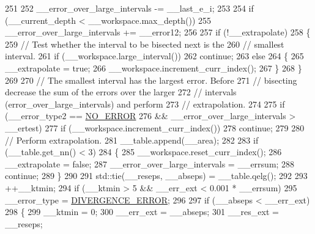 \begin{DoxyCode}
251 
252           \_\_error\_over\_large\_intervals -= \_\_last\_e\_i;
253 
254           \textcolor{keywordflow}{if} (\_\_current\_depth < \_\_workspace.max\_depth())
255             \_\_error\_over\_large\_intervals += \_\_error12;
256 
257           \textcolor{keywordflow}{if} (!\_\_extrapolate)
258             \{
259               \textcolor{comment}{// Test whether the interval to be bisected next is the}
260               \textcolor{comment}{// smallest interval.}
261               \textcolor{keywordflow}{if} (\_\_workspace.large\_interval())
262                 \textcolor{keywordflow}{continue};
263               \textcolor{keywordflow}{else}
264                 \{
265                   \_\_extrapolate = \textcolor{keyword}{true};
266                   \_\_workspace.increment\_curr\_index();
267                 \}
268             \}
269 
270           \textcolor{comment}{// The smallest interval has the largest error.  Before}
271           \textcolor{comment}{// bisecting decrease the sum of the errors over the larger}
272           \textcolor{comment}{// intervals (error\_over\_large\_intervals) and perform}
273           \textcolor{comment}{// extrapolation.}
274 
275           \textcolor{keywordflow}{if} (\_\_error\_type2 == \hyperlink{namespace____gnu__cxx_ad6c62dd86a596716cece6ac2d4cfd4b3ac31eecc280b10dec2efb4a2216ccc2e0}{NO\_ERROR}
276            && \_\_error\_over\_large\_intervals > \_\_ertest)
277             \textcolor{keywordflow}{if} (\_\_workspace.increment\_curr\_index())
278               \textcolor{keywordflow}{continue};
279 
280           \textcolor{comment}{// Perform extrapolation.}
281           \_\_table.append(\_\_area);
282 
283           \textcolor{keywordflow}{if} (\_\_table.get\_nn() < 3)
284             \{
285               \_\_workspace.reset\_curr\_index();
286               \_\_extrapolate = \textcolor{keyword}{false};
287               \_\_error\_over\_large\_intervals = \_\_errsum;
288               \textcolor{keywordflow}{continue};
289             \}
290 
291           std::tie(\_\_reseps, \_\_abseps) = \_\_table.qelg();
292 
293           ++\_\_ktmin;
294           \textcolor{keywordflow}{if} (\_\_ktmin > 5 && \_\_err\_ext < 0.001 * \_\_errsum)
295             \_\_error\_type = \hyperlink{namespace____gnu__cxx_ad6c62dd86a596716cece6ac2d4cfd4b3a5a36b63b8fa7c921d9332c69416c2686}{DIVERGENCE\_ERROR};
296 
297           \textcolor{keywordflow}{if} (\_\_abseps < \_\_err\_ext)
298             \{
299               \_\_ktmin = 0;
300               \_\_err\_ext = \_\_abseps;
301               \_\_res\_ext = \_\_reseps;

\end{DoxyCode}
